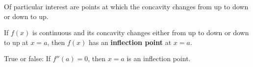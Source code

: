 \documentclass{ximera}
\begin{document}
Of particular interest are points at which the concavity changes from
up to down or down to up. 

\begin{definition}
If $f(x)$ is continuous and its concavity changes either from up to
down or down to up at $x=a$, then $f(x)$ has an \textbf{inflection
  point} at $x=a$.
\end{definition}


\begin{question}
True or false: If $f''(a) = 0$, then $x=a$ is an inflection point.
    \begin{multipleChoice}
    \end{multipleChoice}  
\end{question}
\end{document}
